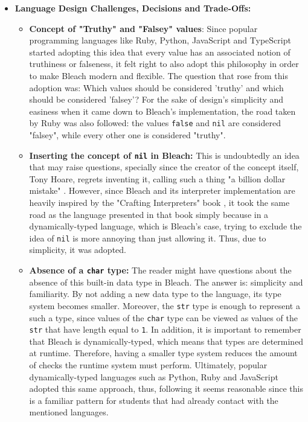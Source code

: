 \begin{itemize}
    \item \textbf{Language Design Challenges, Decisions and Trade-Offs:}
    \begin{itemize}
        \item \textbf{Concept of "Truthy" and "Falsey" values}: Since popular programming languages like Ruby, Python, JavaScript and TypeScript started adopting this idea that every value has an associated notion of truthiness or falseness, it felt right to also adopt this philosophy in order to make Bleach modern and flexible. The question that rose from this adoption was: Which values should be considered 'truthy' and which should be considered 'falsey'? For the sake of design's simplicity and easiness when it came down to Bleach's implementation, the road taken by Ruby was also followed: the values \texttt{false} and \texttt{nil} are considered "falsey", while every other one is considered "truthy".
        
        \item \textbf{Inserting the concept of \texttt{nil} in Bleach:} This is undoubtedly an idea that may raise questions, specially since the creator of the concept itself, Tony Hoare, regrets inventing it, calling such a thing "a billion dollar mistake" \cite{hoare_billion_dollar_mistake}. However, since Bleach and its interpreter implementation are heavily inspired by the "Crafting Interpreters" book \cite{nystrom2021crafting}, it took the same road as the language presented in that book simply because in a dynamically-typed language, which is Bleach's case, trying to exclude the idea of \texttt{nil} is more annoying than just allowing it. Thus, due to simplicity, it was adopted.
        
        \item \textbf{Absence of a \texttt{char} type:} The reader might have questions about the absence of this built-in data type in Bleach. The answer is: simplicity and familiarity. By not adding a new data type to the language, its type system becomes smaller. Moreover, the \texttt{str} type is enough to represent a such a type, since values of the \texttt{char} type can be viewed as values of the \texttt{str} that have length equal to \texttt{1}. In addition, it is important to remember that Bleach is dynamically-typed, which means that types are determined at runtime. Therefore, having a smaller type system reduces the amount of checks the runtime system must perform. Ultimately, popular dynamically-typed languages such as Python, Ruby and JavaScript adopted this same approach, thus, following it seems reasonable since this is a familiar pattern for students that had already contact with the mentioned languages.
        

\end{itemize}
\end{itemize}
